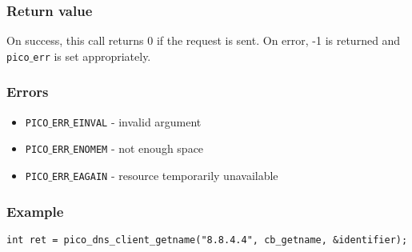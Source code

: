 \subsubsection*{Return value}
On success, this call returns 0 if the request is sent.
On error, -1 is returned and \texttt{pico$\_$err} is set appropriately.

\subsubsection*{Errors}
\begin{itemize}[noitemsep]
\item \texttt{PICO$\_$ERR$\_$EINVAL} - invalid argument
\item \texttt{PICO$\_$ERR$\_$ENOMEM} - not enough space
\item \texttt{PICO$\_$ERR$\_$EAGAIN} - resource temporarily unavailable
\end{itemize}

\subsubsection*{Example}
\begin{verbatim}
int ret = pico_dns_client_getname("8.8.4.4", cb_getname, &identifier);
\end{verbatim}
